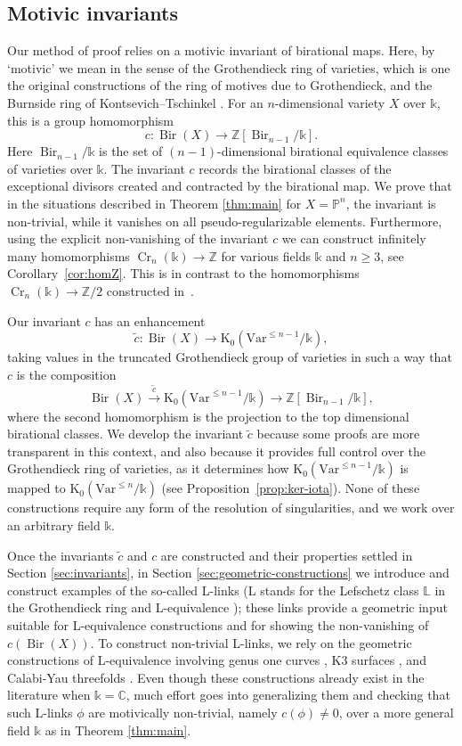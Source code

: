 \documentclass[a4paper,12pt]{amsart}
\def\C{\mathbb C}
\def\k{\mathbb k}
\def\L{\mathbb L}
\def\P{\mathbb P}
\def\Z{\mathbb Z}
\def\Bir{{\operatorname{Bir}}}
\def\Cr{{\operatorname{Cr}}}
\def\Kt{{\mathrm{K}}}
\def\Var{{\mathrm{Var}}}
\theoremstyle{plain}
\numberwithin{equation}{section}
\theoremstyle{definition}
\newcommand{\ssec}{\subsection}
\newcommand{\ti}[1]{\tilde{#1}}
\renewcommand{\(}{\left(}
\renewcommand{\)}{\right)}
\begin{document}
\ssec{Motivic invariants}
\hfill

Our method of proof relies on a 
motivic 
invariant of birational maps.
Here, by `motivic' we mean
in the sense of
the Grothendieck ring of varieties,
which is one the original
constructions 
of the ring of motives due to Grothendieck, 
and the Burnside ring of Kontsevich--Tschinkel
\cite{KontsevichTschinkel}.
For an $n$-dimensional variety $X$ over $\k$,
this is a group homomorphism
\[
c: \Bir(X) \to \Z[\Bir_{n-1}/\k].
\]
Here $\Bir_{n-1}/\k$ is the set of $(n-1)$-dimensional
birational
equivalence classes of varieties over $\k$.
The invariant $c$ records the birational
classes of 
the exceptional divisors created
and contracted by the birational map.
We prove that in the situations described
in Theorem \ref{thm:main} for $X = \P^n$, 
the invariant 
is non-trivial, 
while it vanishes on all pseudo-regularizable elements.
Furthermore, 
using the explicit non-vanishing of the
invariant $c$ we can 
construct infinitely many
homomorphisms $\Cr_n(\k) \to \Z$ for various
fields $\k$ and $n \ge 3$, see Corollary~\ref{cor:homZ}.
This is in contrast to the 
homomorphisms $\Cr_n(\k) \to \Z/2$ constructed in~\cite{BLZ}.


Our invariant $c$ 
has an enhancement
\[
\ti{c}: \Bir(X) \to \Kt_0(\Var^{\le n-1}/\k),
\]
taking values in the truncated
Grothendieck group of varieties
in such a way that $c$ is the composition
\[
\Bir(X) \overset{\ti{c}}{\to} \Kt_0(\Var^{\le n-1}/\k) \to \Z[\Bir_{n-1}/\k],
\]
where the second homomorphism is the projection to the top dimensional
birational classes. We develop the invariant $\ti{c}$ 
because some proofs are more transparent in this context,
and also because
it provides full control over
the Grothendieck ring of varieties, 
as it determines how
$\Kt_0(\Var^{\le n-1}/\k)$ is mapped to $\Kt_0(\Var^{\le n}/\k)$ 
(see Proposition~\ref{prop:ker-iota}).
None of these constructions require
any form of the
resolution of singularities, and
we work over an arbitrary field
$\k$.

Once the invariants $\ti{c}$ and $c$ are constructed
and their properties settled in Section \ref{sec:invariants}, 
in Section \ref{sec:geometric-constructions}
we introduce and
construct examples of the so-called L-links 
(L stands for the Lefschetz class $\L$
in the Grothendieck ring and L-equivalence \cite{KuznetsovShinder}); 
these links provide a geometric input suitable
for L-equivalence constructions 
and for showing the non-vanishing of $c(\Bir(X))$.
To construct non-trivial L-links, 
we rely on the geometric constructions
of L-equivalence
involving genus one curves
\cite{Mori-Mukai, Crauder-Katz, ShinderZhang}, 
K3 surfaces \cite{HassettLai}, 
and Calabi-Yau threefolds \cite{IMOUG2}.
Even though these constructions already exist in the literature when
$\k = \C$,
much effort goes into generalizing them and checking 
that such L-links $\phi$ are motivically non-trivial,
namely $c(\phi) \ne 0$,
over a more general field $\k$ as in Theorem \ref{thm:main}.
\end{document}
